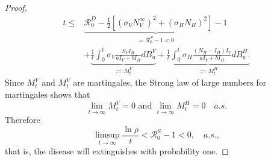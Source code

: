 \begin{proof}
\begin{equation}
\begin{aligned}
{            }{t}
            \leq &
                \underbrace{
                    \mathcal{R}_0 ^ D
                    -
                    \frac{1}{2}
                    \left [
                        \left(
                            \sigma_V N_V ^ \infty
                        \right) ^ 2
                        +
                        \left(
                            \sigma_H N_H
                        \right) ^2
                    \right ] - 1
                }_{=\mathcal{R}_0 ^ S - 1 < 0}
                \\
                & +
                \underbrace{
                    \frac{1}{t}
                    \int_{0}^{t}
                        \sigma_V 
                        \frac{S_V I_H}{a I_V + b I_H}
                    d B_u ^ V
               }_{:=M_t^V}
                +
               \underbrace{
                    \frac{1}{t}
                    \int_{0}^{t}
                        \sigma_H
                        \frac{(N_H - I_H) I_V}{a I_V + b I_H}
                    d B_u ^ H.
               }_{:= M_t ^ H}
        \end{aligned}
    \end{equation}
    Since $M_t^V$ and $M_t^V$ are martingales, the Strong law of large 
    numbers for martingales {\citet[p. 12, Thm. 3.4]{Mao2007}} shows that
    $$
        \lim_{t \to \infty}
            M_t^V = 0 \text{ and }
        \lim_{t \to \infty}
            M_t^H = 0 
        \quad a.s.
    $$    
    Therefore
    $$
        \limsup_{t \to \infty}
            \frac{\ln \rho}{t} <
            \mathcal{R}_0 ^ S - 1 < 0, \quad a.s.,
    $$
    that is, the disease will extinguishes with probability one.
\end{proof}
